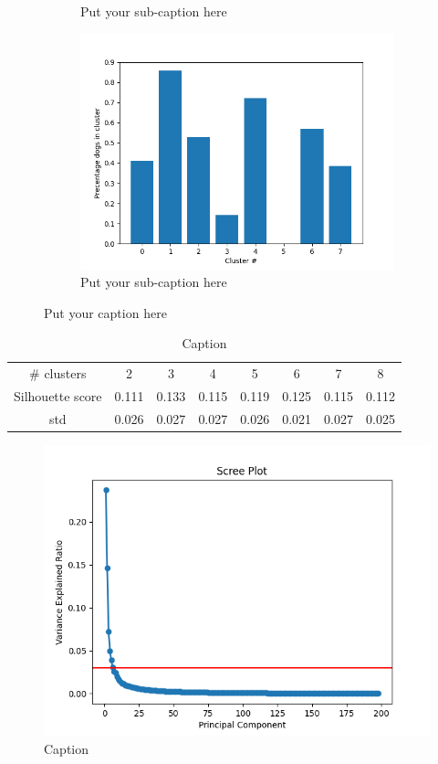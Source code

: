 \documentclass{article}
\begin{document}
\begin{figure}[ht]
\begin{subfigure}{.33\textwidth}
  \caption{Put your sub-caption here}
  \label{fig:sub-second}
\end{subfigure}
\begin{subfigure}{.33\textwidth}
  \centering
  \includegraphics[width=1\linewidth]{1c/label overlapp 8 clusters.png}  
  \caption{Put your sub-caption here}
  \label{fig:sub-second}
\end{subfigure}
\caption{Put your caption here}
\label{LabelOverlap}
\end{figure}
\begin{table}[H]
    \centering
    \begin{tabular}{c|c|c|c|c|c|c|c}
        # clusters & 2& 3& 4& 5& 6& 7& 8  \\
       Silhouette score  & 0.111 & 0.133 & 0.115 & 0.119 &  0.125 &  0.115 &  0.112 \\
       std & 0.026 &  0.027 &  0.027 &  0.026 &  0.021 &  0.027 &  0.025 
    \end{tabular}
    \caption{Caption}
    \label{sill}
\end{table}

\begin{figure}[H]
    \centering
    \includegraphics[scale=0.4]{1c/Scree plot.png}
    \caption{Caption}
    \label{scree}
\end{figure}
\end{document}
